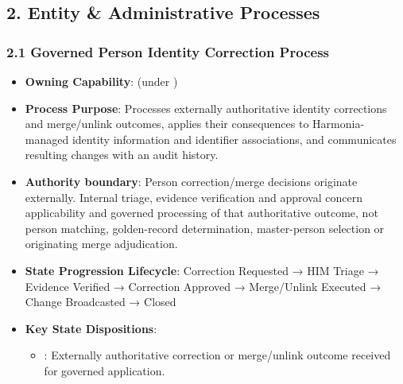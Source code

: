 \par\smallskip
{}\label{rad:processes:67}
\subsection*{2. Entity \& Administrative Processes}
\label{rad:processes:69}
\subsubsection*{2.1 Governed Person Identity Correction Process}
\label{rad:processes:70}

\begin{itemize}

\item
\textbf{Owning Capability}: \texttt{} (under \texttt{})



\item
\textbf{Process Purpose}: Processes externally authoritative identity corrections and merge/\allowbreak{}unlink outcomes, applies their consequences to Harmonia-managed identity information and identifier associations, and communicates resulting changes with an audit history.



\item
\textbf{Authority boundary}: Person correction/\allowbreak{}merge decisions originate externally. Internal triage, evidence verification and approval concern applicability and governed processing of that authoritative outcome, not person matching, golden-record determination, master-person selection or originating merge adjudication.



\item
\textbf{State Progression Lifecycle}: Correction Requested → HIM Triage → Evidence Verified → Correction Approved → Merge/\allowbreak{}Unlink Executed → Change Broadcasted → Closed



\item
\textbf{Key State Dispositions}:


\begin{itemize}

\item
\texttt{}: Externally authoritative correction or merge/\allowbreak{}unlink outcome received for governed application.




\end{itemize}
\end{itemize}
